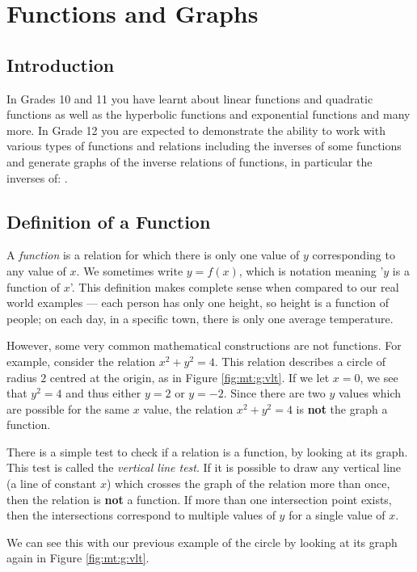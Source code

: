 \chapter{Functions and Graphs}
\label{m:fg12}

\section{Introduction}
\label{m:fg12:i}
In Grades 10 and 11 you have learnt about linear functions and quadratic functions as well as the hyperbolic functions and exponential functions and many more.  In Grade 12 you are expected to demonstrate the ability to work with
various types of functions and  relations including  the inverses of some functions and generate graphs of the
inverse relations of functions, in particular the  inverses of:
.

\section{Definition of a Function}
A \textit{function} is a relation for which there is only one value of $y$ corresponding to any value of $x$. We sometimes write $y=f(x)$, which is notation meaning '$y$ is a function of $x$'. This definition makes complete sense when compared to our real world examples --- each person has only one height, so height is a function of people; on each day, in a specific town, there is only one average temperature.

However, some very common  mathematical constructions are not functions. For example, consider the relation $x^2+y^2=4$. This relation describes a circle of radius $2$ centred at the origin, as in Figure \ref{fig:mt:g:vlt}. If we let $x=0$, we see that $y^2=4$ and thus either $y=2$ or $y=-2$. Since there are two $y$ values which are possible for the same $x$ value, the relation $x^2+y^2=4$ is \textbf{not} the graph a function.

There is a simple test to check if a relation is a function, by looking at its graph. This test is called the \textit{vertical line test}. If it is possible to draw any vertical line (a line of constant $x$) which crosses the graph of the relation more than once, then the relation is \textbf{not} a function. If more than one intersection point exists, then the intersections correspond to multiple values of $y$ for a single value of $x$.

We can see this with our previous example of the circle by looking at its graph again in Figure \ref{fig:mt:g:vlt}.

